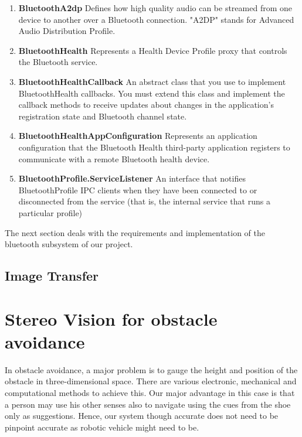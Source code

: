 \documentclass[11pt]{report}
\begin{document}
{{\begin{enumerate}
\item \textbf{BluetoothA2dp}\newline 
Defines how high quality audio can be streamed from one device to another over a Bluetooth connection. "A2DP" stands for Advanced Audio Distribution Profile.

\item \textbf{BluetoothHealth}\newline 
Represents a Health Device Profile proxy that controls the Bluetooth service.

\item \textbf{BluetoothHealthCallback}\newline 
An abstract class that you use to implement BluetoothHealth callbacks. You must extend this class and implement the callback methods to receive updates about changes in the application’s registration state and Bluetooth channel state.

\item \textbf{BluetoothHealthAppConfiguration}\newline 
Represents an application configuration that the Bluetooth Health third-party application registers to communicate with a remote Bluetooth health device.

\item \textbf{BluetoothProfile.ServiceListener}\newline 
An interface that notifies BluetoothProfile IPC clients when they have been connected to or disconnected from the service (that is, the internal service that runs a particular profile)

\end{enumerate}

The next section deals with the requirements and implementation of the bluetooth subsystem of our project.

\label{imagetransfer}
\subsection{Image Transfer}

\label{stereoalgo}
\section{Stereo Vision for obstacle avoidance}

In obstacle avoidance, a major problem is to gauge the height and position of the obstacle in three-dimensional space. There are various electronic, mechanical and computational methods to achieve this\cite{slam,infrared, thorpe1988vision}. Our major advantage in this case is that a person may use his other senses also to navigate using the cues from the shoe only as suggestions. Hence, our system though accurate does not need to be pinpoint accurate as robotic vehicle might need to be.

}}
\end{document}
